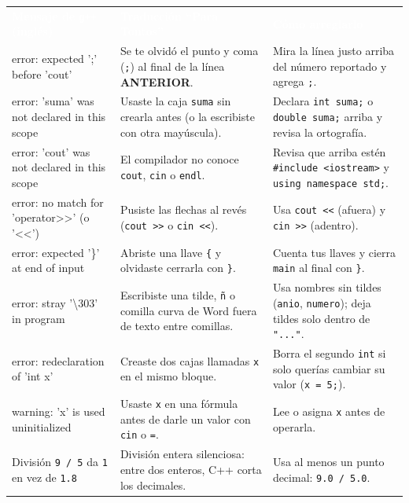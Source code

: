 \documentclass[11pt,letterpaper]{article}
\begin{document}
\begin{center}
\footnotesize
\renewcommand{\arraystretch}{1.3}
\begin{tabularx}{\linewidth}{>{\leavevmode\ttfamily\scriptsize\color{RojoAlerta}\raggedright\arraybackslash}p{4.6cm} >{\leavevmode\raggedright\arraybackslash}p{4.8cm} >{\leavevmode\raggedright\arraybackslash}X}
  \rowcolor{AzulMarino}
  \textcolor{white}{\textbf{\sffamily Mensaje de \texttt{g++} (inglés)}} &
  \textcolor{white}{\textbf{Traducción ``Para Tontos''}} &
  \textcolor{white}{\textbf{Cómo arreglarlo}} \\
  error: expected ';' before 'cout' & Se te olvidó el punto y coma (\texttt{;}) al final de la línea \textbf{ANTERIOR}. & Mira la línea justo arriba del número reportado y agrega \texttt{;}. \\
  error: 'suma' was not declared in this scope & Usaste la caja \texttt{suma} sin crearla antes (o la escribiste con otra mayúscula). & Declara \texttt{int suma;} o \texttt{double suma;} arriba y revisa la ortografía. \\
  error: 'cout' was not declared in this scope & El compilador no conoce \texttt{cout}, \texttt{cin} o \texttt{endl}. & Revisa que arriba estén \texttt{\#include <iostream>} y \texttt{using namespace std;}. \\
  error: no match for 'operator>>' (o '<<') & Pusiste las flechas al revés (\texttt{cout >>} o \texttt{cin <<}). & Usa \texttt{cout <<} (afuera) y \texttt{cin >>} (adentro). \\
  error: expected '\}' at end of input & Abriste una llave \texttt{\{} y olvidaste cerrarla con \texttt{\}}. & Cuenta tus llaves y cierra \texttt{main} al final con \texttt{\}}. \\
  error: stray '\textbackslash 303' in program & Escribiste una tilde, \texttt{ñ} o comilla curva de Word fuera de texto entre comillas. & Usa nombres sin tildes (\texttt{anio}, \texttt{numero}); deja tildes solo dentro de \texttt{"..."}. \\
  error: redeclaration of 'int x' & Creaste dos cajas llamadas \texttt{x} en el mismo bloque. & Borra el segundo \texttt{int} si solo querías cambiar su valor (\texttt{x = 5;}). \\
  warning: 'x' is used uninitialized & Usaste \texttt{x} en una fórmula antes de darle un valor con \texttt{cin} o \texttt{=}. & Lee o asigna \texttt{x} antes de operarla. \\
  División \texttt{9 / 5} da \texttt{1} en vez de \texttt{1.8} & División entera silenciosa: entre dos enteros, C++ corta los decimales. & Usa al menos un punto decimal: \texttt{9.0 / 5.0}. \\
\bottomrule
\end{tabularx}
\end{center}
\end{document}
